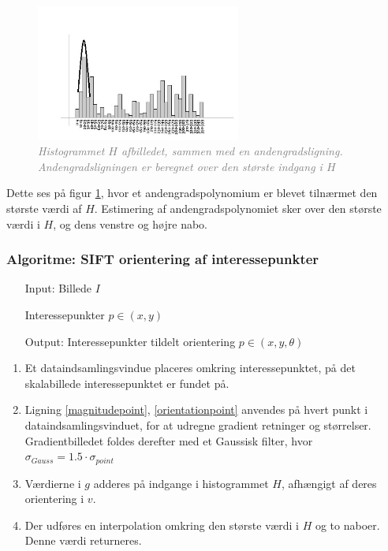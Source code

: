 \begin{figure}[H]
    \centering
    \includegraphics[width=0.60\textwidth]{fig/sift-orientation-histogram.jpg}
     \vspace{-1em}
    \begin{center}    
       \caption{\textcolor{gray}{\footnotesize \textit{Histogrammet $H$ afbilledet, sammen med en andengradsligning. Andengradsligningen er beregnet over den største indgang i $H$}}}
    \label{histogramheight}
     \end{center}
     \vspace{-2.5em}
  \end{figure} \noindent
Dette ses på figur \ref{histogramheight}, hvor et andengradspolynomium er blevet tilnærmet den største værdi af $H$. Estimering af andengradspolynomiet sker over den største værdi i $H$, og dens venstre og højre nabo.


\subsubsection*{Algoritme: SIFT orientering af interessepunkter}
\begin{enumerate}
\item[Input:] Billede $I$
\item[] Interessepunkter $p  \in (x, y)$
\item[Output:]  Interessepunkter tildelt orientering $p \in (x,y, \theta)$
\end{enumerate}

\begin{enumerate}
\item Et dataindsamlingsvindue placeres omkring interessepunktet, på det skalabillede interessepunktet er fundet på.
\item Ligning \eqref{magnitudepoint}, \eqref{orientationpoint} anvendes på hvert punkt i dataindsamlingsvinduet, for at udregne gradient retninger og størrelser. Gradientbilledet foldes derefter med et Gaussisk filter, hvor $\sigma_{Gauss} = 1.5 \cdot \sigma_{point}$
\item Værdierne i $g$ adderes på indgange i histogrammet $H$, afhængigt af deres orientering i $v$.
\item  Der udføres en interpolation omkring den største værdi i $H$ og to naboer. Denne værdi returneres.
\end{enumerate}
